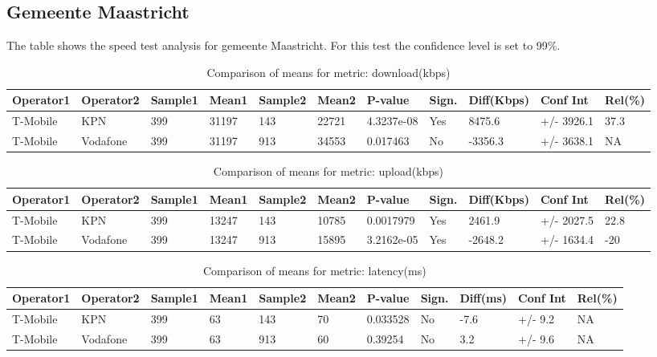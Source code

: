 \documentclass[]{article}
\begin{document}
\normalsize

\newpage

\subsection{Gemeente Maastricht}\label{gemeente-maastricht}

The table shows the speed test analysis for gemeente Maastricht. For
this test the confidence level is set to 99\%.

\begin{table}[ht]
\centering
{\footnotesize
\begin{tabular}{lllllllllll}
  \hline
Operator1 & Operator2 & Sample1 & Mean1 & Sample2 & Mean2 & P-value & Sign. & Diff(Kbps) & Conf Int & Rel(\%) \\ 
  \hline
T-Mobile & KPN & 399 & 31197 & 143 & 22721 & 4.3237e-08 & Yes & 8475.6 & +/- 3926.1 & 37.3 \\ 
  T-Mobile & Vodafone & 399 & 31197 & 913 & 34553 & 0.017463 & No & -3356.3 & +/- 3638.1 & NA \\ 
   \hline
\end{tabular}
}
\caption{Comparison of means for metric: download(kbps)} 
\end{table}

\begin{table}[ht]
\centering
{\footnotesize
\begin{tabular}{lllllllllll}
  \hline
Operator1 & Operator2 & Sample1 & Mean1 & Sample2 & Mean2 & P-value & Sign. & Diff(Kbps) & Conf Int & Rel(\%) \\ 
  \hline
T-Mobile & KPN & 399 & 13247 & 143 & 10785 & 0.0017979 & Yes & 2461.9 & +/- 2027.5 & 22.8 \\ 
  T-Mobile & Vodafone & 399 & 13247 & 913 & 15895 & 3.2162e-05 & Yes & -2648.2 & +/- 1634.4 & -20 \\ 
   \hline
\end{tabular}
}
\caption{Comparison of means for metric: upload(kbps)} 
\end{table}

\begin{table}[ht]
\centering
{\footnotesize
\begin{tabular}{lllllllllll}
  \hline
Operator1 & Operator2 & Sample1 & Mean1 & Sample2 & Mean2 & P-value & Sign. & Diff(ms) & Conf Int & Rel(\%) \\ 
  \hline
T-Mobile & KPN & 399 & 63 & 143 & 70 & 0.033528 & No & -7.6 & +/- 9.2 & NA \\ 
  T-Mobile & Vodafone & 399 & 63 & 913 & 60 & 0.39254 & No & 3.2 & +/- 9.6 & NA \\ 
   \hline
\end{tabular}
}
\caption{Comparison of means for metric: latency(ms)} 
\end{table}
\end{document}
